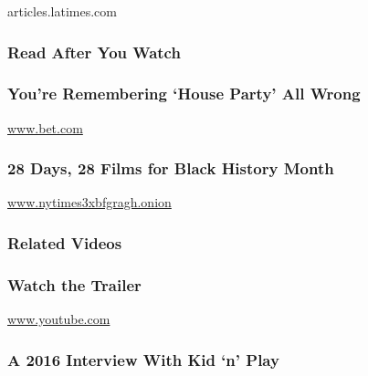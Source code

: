 articles.latimes.com

\hypertarget{read-after-you-watch}{%
\subsubsection{Read After You Watch}\label{read-after-you-watch}}

\href{https://www.bet.com/news/celebrities/2015/03/09/commentary-you-re-remembering-house-party-all-wrong.html}{}

\hypertarget{youre-remembering-house-party-all-wrong}{%
\subsubsection{You're Remembering `House Party' All
Wrong}\label{youre-remembering-house-party-all-wrong}}

\href{http://www.bet.com}{www.bet.com}

\href{https://www.nytimes3xbfgragh.onion/interactive/2018/02/01/movies/28-essential-films-black-history-month.html}{}

\hypertarget{28-days-28-films-for-black-history-month}{%
\subsubsection{28 Days, 28 Films for Black History
Month}\label{28-days-28-films-for-black-history-month}}

\href{http://www.nytimes3xbfgragh.onion}{www.nytimes3xbfgragh.onion}

\hypertarget{related-videos}{%
\subsubsection{Related Videos}\label{related-videos}}

\href{https://www.youtube.com/watch?v=XzRfOiNFBkc}{}

\hypertarget{watch-the-trailer}{%
\subsubsection{Watch the Trailer}\label{watch-the-trailer}}

\href{http://www.youtube.com}{www.youtube.com}

\href{https://www.youtube.com/watch?v=9M5nIuj9oWQ}{}

\hypertarget{a-2016-interview-with-kid-n-play}{%
\subsubsection{A 2016 Interview With Kid `n'
Play}\label{a-2016-interview-with-kid-n-play}}


